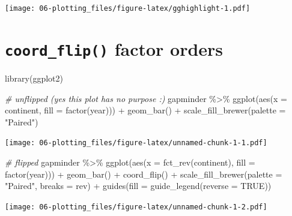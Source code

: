\documentclass[
]{book}
\newenvironment{Shaded}{\begin{snugshade}}{\end{snugshade}}
\newcommand{\AttributeTok}[1]{\textcolor[rgb]{0.77,0.63,0.00}{#1}}
\newcommand{\CommentTok}[1]{\textcolor[rgb]{0.56,0.35,0.01}{\textit{#1}}}
\newcommand{\ConstantTok}[1]{\textcolor[rgb]{0.00,0.00,0.00}{#1}}
\newcommand{\FunctionTok}[1]{\textcolor[rgb]{0.00,0.00,0.00}{#1}}
\newcommand{\NormalTok}[1]{#1}
\newcommand{\SpecialCharTok}[1]{\textcolor[rgb]{0.00,0.00,0.00}{#1}}
\newcommand{\StringTok}[1]{\textcolor[rgb]{0.31,0.60,0.02}{#1}}
\begin{document}
\texttt{[image: 06-plotting\_files/figure-latex/gghighlight-1.pdf]}

\hypertarget{coord_flip-factor-orders}{%
\section{\texorpdfstring{\texttt{coord\_flip()} factor orders}{coord\_flip() factor orders}}\label{coord_flip-factor-orders}}

\begin{Shaded}
\begin{Highlighting}[]
\FunctionTok{library}\NormalTok{(ggplot2)}

\CommentTok{\# unflipped (yes this plot has no purpose :)}
\NormalTok{gapminder }\SpecialCharTok{\%\textgreater{}\%} 
  \FunctionTok{ggplot}\NormalTok{(}\FunctionTok{aes}\NormalTok{(}\AttributeTok{x =}\NormalTok{ continent, }\AttributeTok{fill =} \FunctionTok{factor}\NormalTok{(year))) }\SpecialCharTok{+} 
  \FunctionTok{geom\_bar}\NormalTok{() }\SpecialCharTok{+} 
  \FunctionTok{scale\_fill\_brewer}\NormalTok{(}\AttributeTok{palette =} \StringTok{"Paired"}\NormalTok{)}
\end{Highlighting}
\end{Shaded}

\texttt{[image: 06-plotting\_files/figure-latex/unnamed-chunk-1-1.pdf]}

\begin{Shaded}
\begin{Highlighting}[]
\CommentTok{\# flipped}
\NormalTok{gapminder }\SpecialCharTok{\%\textgreater{}\%} 
  \FunctionTok{ggplot}\NormalTok{(}\FunctionTok{aes}\NormalTok{(}\AttributeTok{x =} \FunctionTok{fct\_rev}\NormalTok{(continent), }\AttributeTok{fill =} \FunctionTok{factor}\NormalTok{(year))) }\SpecialCharTok{+} 
  \FunctionTok{geom\_bar}\NormalTok{() }\SpecialCharTok{+} 
  \FunctionTok{coord\_flip}\NormalTok{() }\SpecialCharTok{+} 
  \FunctionTok{scale\_fill\_brewer}\NormalTok{(}\AttributeTok{palette =} \StringTok{"Paired"}\NormalTok{, }\AttributeTok{breaks =}\NormalTok{ rev) }\SpecialCharTok{+} 
  \FunctionTok{guides}\NormalTok{(}\AttributeTok{fill =} \FunctionTok{guide\_legend}\NormalTok{(}\AttributeTok{reverse =} \ConstantTok{TRUE}\NormalTok{))}
\end{Highlighting}
\end{Shaded}

\texttt{[image: 06-plotting\_files/figure-latex/unnamed-chunk-1-2.pdf]}
\end{document}
